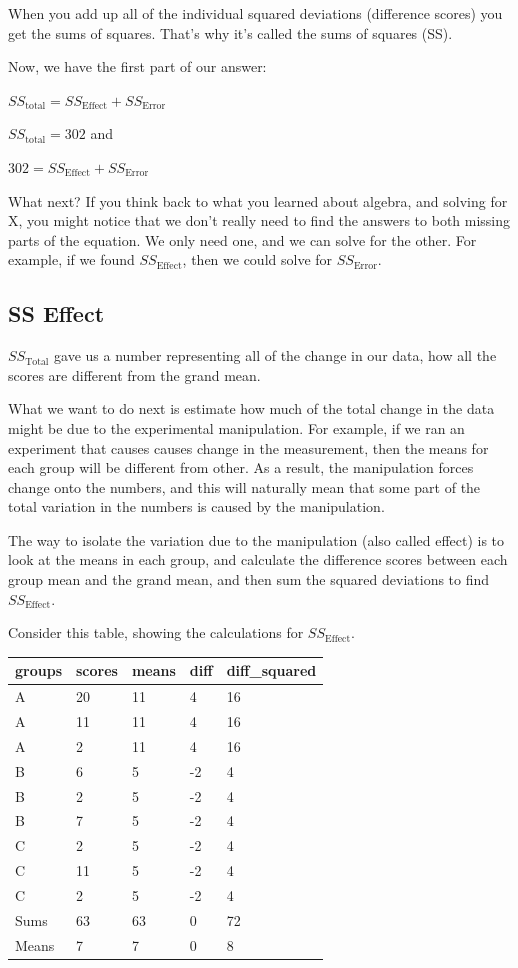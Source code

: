 \documentclass[
  letterpaper,
  DIV=11,
  numbers=noendperiod]{scrreprt}
\begin{document}
When you add up all of the individual squared deviations (difference
scores) you get the sums of squares. That's why it's called the sums of
squares (SS).

Now, we have the first part of our answer:

\(SS_\text{total} = SS_\text{Effect} + SS_\text{Error}\)

\(SS_\text{total} = 302\) and

\(302 = SS_\text{Effect} + SS_\text{Error}\)

What next? If you think back to what you learned about algebra, and
solving for X, you might notice that we don't really need to find the
answers to both missing parts of the equation. We only need one, and we
can solve for the other. For example, if we found \(SS_\text{Effect}\),
then we could solve for \(SS_\text{Error}\).

\subsection{SS Effect}\label{ss-effect}

\(SS_\text{Total}\) gave us a number representing all of the change in
our data, how all the scores are different from the grand mean.

What we want to do next is estimate how much of the total change in the
data might be due to the experimental manipulation. For example, if we
ran an experiment that causes causes change in the measurement, then the
means for each group will be different from other. As a result, the
manipulation forces change onto the numbers, and this will naturally
mean that some part of the total variation in the numbers is caused by
the manipulation.

The way to isolate the variation due to the manipulation (also called
effect) is to look at the means in each group, and calculate the
difference scores between each group mean and the grand mean, and then
sum the squared deviations to find \(SS_\text{Effect}\).

Consider this table, showing the calculations for \(SS_\text{Effect}\).

\begin{longtable}[]{@{}lllll@{}}
\toprule\noalign{}
groups & scores & means & diff & diff\_squared \\
\midrule\noalign{}
\endhead
\bottomrule\noalign{}
\endlastfoot
A & 20 & 11 & 4 & 16 \\
A & 11 & 11 & 4 & 16 \\
A & 2 & 11 & 4 & 16 \\
B & 6 & 5 & -2 & 4 \\
B & 2 & 5 & -2 & 4 \\
B & 7 & 5 & -2 & 4 \\
C & 2 & 5 & -2 & 4 \\
C & 11 & 5 & -2 & 4 \\
C & 2 & 5 & -2 & 4 \\
Sums & 63 & 63 & 0 & 72 \\
Means & 7 & 7 & 0 & 8 \\
\end{longtable}
\end{document}

